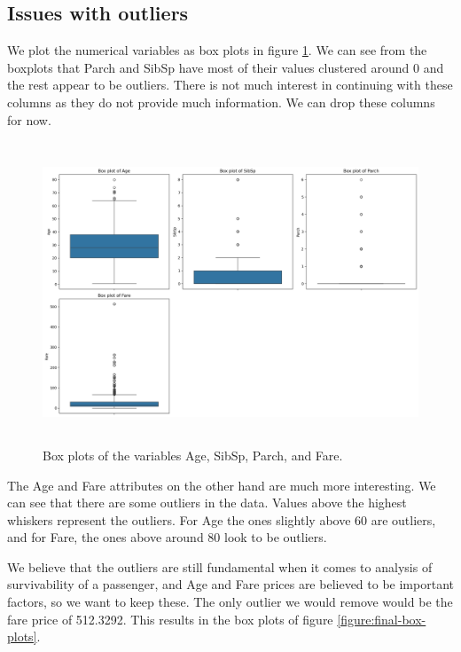 \documentclass[twoside,11pt]{article}
\begin{document}
\subsection*{Issues with outliers}

We plot the numerical variables as box plots in figure \ref{figure:initial-box-plots}. We can see from the boxplots that Parch and SibSp have most of their values clustered around 0 and the rest appear to be outliers. There is not much interest in continuing with these columns as they do not provide much information. We can drop these columns for now.

\begin{figure}[h!]
	\centering
	\includegraphics[height=9cm]{analysis_files/analysis_2_0.png}
	\caption{Box plots of the variables Age, SibSp, Parch, and Fare.}
	\label{figure:initial-box-plots}
\end{figure}

The Age and Fare attributes on the other hand are much more interesting. We can see that there are some outliers in the data. Values above the highest whiskers represent the outliers. For Age the ones slightly above 60 are outliers, and for Fare, the ones above around 80 look to be outliers.

We believe that the outliers are still fundamental when it comes to analysis of survivability of a passenger, and Age and Fare prices are believed to be important factors, so we want to keep these. The only outlier we would remove would be the fare price of 512.3292. This results in the box plots of figure \ref{figure:final-box-plots}.
\end{document}

